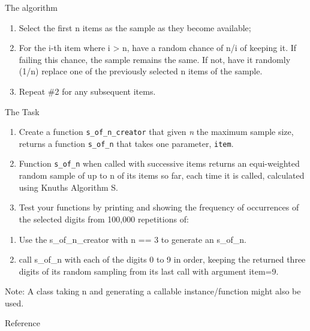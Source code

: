 \begin{description}
\item[The algorithm]
\end{description}

\begin{enumerate}
\item
  Select the first n items as the sample as they become available;
\item
  For the i-th item where i \textgreater{} n, have a random chance of
  n/i of keeping it. If failing this chance, the sample remains the
  same. If not, have it randomly (1/n) replace one of the previously
  selected n items of the sample.
\item
  Repeat \#2 for any subsequent items.
\end{enumerate}

\begin{description}
\item[The Task]
\end{description}

\begin{enumerate}
\item
  Create a function \texttt{s\_of\_n\_creator} that given \emph{n} the
  maximum sample size, returns a function \texttt{s\_of\_n} that takes
  one parameter, \texttt{item}.
\item
  Function \texttt{s\_of\_n} when called with successive items returns
  an equi-weighted random sample of up to n of its items so far, each
  time it is called, calculated using Knuths Algorithm S.
\item
  Test your functions by printing and showing the frequency of
  occurrences of the selected digits from 100,000 repetitions of:
\end{enumerate}

\begin{enumerate}
\item
  Use the s\_of\_n\_creator with n == 3 to generate an s\_of\_n.
\item
  call s\_of\_n with each of the digits 0 to 9 in order, keeping the
  returned three digits of its random sampling from its last call with
  argument item=9.
\end{enumerate}

Note: A class taking n and generating a callable instance/function might
also be used.

\begin{description}
\item[Reference]
\end{description}

